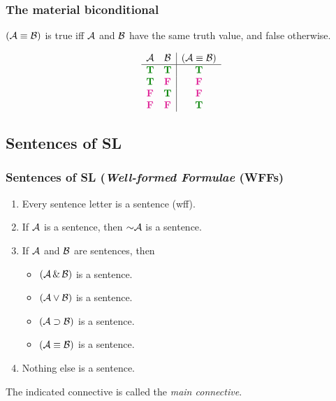 \begin{frame}
  \frametitle{The material biconditional \eiff}
  
  \begin{definition}
    $(\mathcal{A} \equiv \mathcal{B})$ is true iff $\mathcal{A}$ and
    $\mathcal{B}$ have the same truth value, and false otherwise.
    \end{definition}
  \[
  \begin{array}{cc|c}
  \metav{A} & \metav{B} & (\metav{A} \eiff \metav{B})\\
  \hline
  \True & \True & \True\\
  \True & \False & \False\\
  \False & \True & \False\\
  \False & \False & \True
  \end{array}
  \]
  
\end{frame}

\subsection{Sentences of SL}

\begin{frame}
\frametitle{Sentences of SL (\textit{Well-formed Formulae} (WFFs)}

  \begin{definition}
  \begin{enumerate}
  \item Every sentence letter is a sentence (wff).
  \item If $\mathcal{A}$ is a sentence, then $\enot\metav{A}$ is a sentence.
  \item If $\mathcal{A}$ and $\mathcal{B}$ are sentences, then
  \begin{itemize}
  \item $(\mathcal{A}\,\&\,\mathcal{B})$ is a sentence.
  \item $(\mathcal{A}\vee\mathcal{B})$ is a sentence.
  \item $(\mathcal{A}\supset\mathcal{B})$ is a sentence.
  \item $(\mathcal{A}\equiv\mathcal{B})$ is a sentence.
  \end{itemize}
  \item Nothing else is a sentence.
  \end{enumerate}
  \end{definition}

  The indicated connective is called the \emph{main connective}.
\end{frame}

